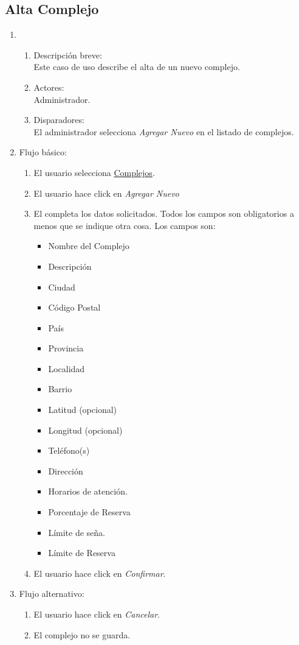 \documentclass[a4paper,11pt]{article}
\begin{document}
\subsection{Alta Complejo}
\begin{enumerate}

    \item
    \begin{enumerate}
    \item Descripci\'on breve: \\
        Este caso de uso describe el alta de un nuevo complejo.
    \item Actores: \\
        Administrador.
    \item Disparadores: \\
        El administrador selecciona \emph{Agregar Nuevo} en el listado de complejos.
    \end{enumerate} 
    \item Flujo b\'asico:
		\begin{enumerate}
        		\item El usuario selecciona \underline{Complejos}.
                        \item El usuario hace click en \emph{Agregar Nuevo}
			\item El completa los datos solicitados. Todos los campos son obligatorios a menos que se indique otra cosa. Los campos son: 
			\begin{itemize}
				 \item Nombre del Complejo
				 \item Descripci\'on
				 \item Ciudad
				 \item C\'odigo Postal
				 \item Pa\'is
		                 \item Provincia
				 \item Localidad
				 \item Barrio
				 \item Latitud (opcional)
				 \item Longitud (opcional)
				 \item Tel\'efono(s)
				 \item Direcci\'on
				 \item Horarios de atenci\'on.
				 \item Porcentaje de Reserva
				 \item L\'imite de se\~na.
				 \item L\'imite de Reserva
			\end{itemize}
                        \item El usuario hace click en \emph{Confirmar}.
                \end{enumerate}
	\item Flujo alternativo:
		\begin{enumerate}
		 \item El usuario hace click en \emph{Cancelar}.
		 \item El complejo no se guarda.
		\end{enumerate}


\end{enumerate}
\end{document}
